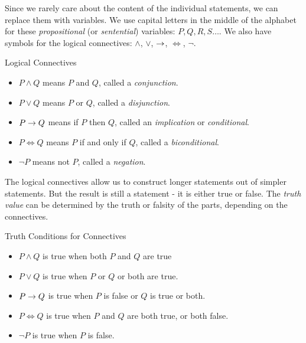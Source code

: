 \documentclass[12pt]{article}
\begin{document}
Since we rarely care about the content of the individual statements, we can replace them with variables.  We use capital letters in the middle of the alphabet for these {\em propositional} (or {\em sentential}) variables: $P, Q, R, S\ldots$.  We also have symbols for the logical connectives: $\wedge$, $\vee$, $\rightarrow$, $\iff$, $\neg$.

\begin{defbox}{Logical Connectives}
\begin{itemize}
 \item $P \wedge Q$ means  $P$ and $Q$, called a {\em conjunction}.
\item $P \vee Q$ means $P$ or $Q$, called a {\em disjunction}.
\item $P \rightarrow Q$ means if $P$ then $Q$, called an {\em implication} or {\em conditional}.
\item $P \iff Q$ means $P$ if and only if $Q$, called a {\em biconditional}.
\item $\neg P$ means not $P$, called a {\em negation}.
\end{itemize}
\end{defbox}

The logical connectives allow us to construct longer statements out of simpler statements.  But the result is still a statement - it is either true or false.  The {\em truth value} can be determined by the truth or falsity of the parts, depending on the connectives.  


\begin{defbox}{Truth Conditions for Connectives}
\begin{itemize}
 \item $P \wedge Q$ is true when both $P$ and $Q$ are true
\item $P \vee Q$ is true when $P$ or $Q$ or both are true.
\item $P \rightarrow Q$ is true when $P$ is false or $Q$ is true or both.
\item $P \iff Q$ is true when $P$ and $Q$ are both true, or both false.
\item $\neg P$ is true when $P$ is false. 
\end{itemize}
\end{defbox}
\end{document}
